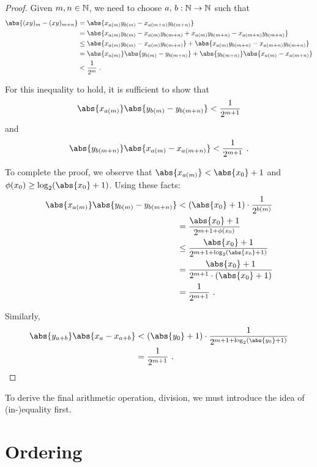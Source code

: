 \documentclass[leqno]{report}
\begin{document}
\begin{proof}
    Given $m, n \in \mathbb{N}$, we need to choose $a,\, b : \mathbb{N} \rightarrow \mathbb{N}$ such that
    \begin{align*}
        \abs{(xy)_m - (xy)_{m+n}}
        &= \abs{x_{a(m)} y_{b(m)} - x_{a(m+n)} y_{b(m+n)}} \\
        &= \abs{x_{a(m)} y_{b(m)} - x_{a(m)} y_{b(m+n)} + x_{a(m)} y_{b(m+n)} - x_{a(m+n)} y_{b(m+n)}} \\
        &\leq \abs{x_{a(m)} y_{b(m)} - x_{a(m)} y_{b(m+n)}} + \abs{x_{a(m)} y_{b(m+n)} - x_{a(m+n)} y_{b(m+n)}} \\
        &= \abs{x_{a(m)}}\abs{y_{b(m)} - y_{b(m+n)}} + \abs{y_{b(m+n)}}\abs{x_{a(m)} - x_{a(m+n)}} \\
        &< \frac{1}{2^m}
        \ .
    \end{align*}

    For this inequality to hold, it is sufficient to show that
    \[ \abs{x_{a(m)}}\abs{y_{b(m)} - y_{b(m+n)}} < \frac{1}{2^{m+1}} \]
    and
    \[ \abs{y_{b(m+n)}}\abs{x_{a(m)} - x_{a(m+n)}} < \frac{1}{2^{m+1}} \ . \]

    To complete the proof, we observe that $\abs{x_{a(m)}} < \abs{x_0} + 1$ and $\phi(x_0) \geq \log_2(\abs{x_0} + 1)$. Using these facts:
    \begin{align*}
        \abs{x_{a(m)}}\abs{y_{b(m)} - y_{b(m+n)}}
        &< (\abs{x_0} + 1) \cdot \frac{1}{2^{b(m)}} \\
        &= \frac{\abs{x_0} + 1}{2^{m + 1 + \phi(x_0)}} \\
        &\leq \frac{\abs{x_0} + 1}{2^{m + 1 + \log_2(\abs{x_0} + 1)}} \\
        &= \frac{\abs{x_0} + 1}{2^{m + 1} \cdot (\abs{x_0} + 1)} \\
        &= \frac{1}{2^{m + 1}}
        \ .
    \end{align*}

    Similarly,
    \begin{align*}
        \abs{y_{a+b}}\abs{x_a - x_{a+b}}
        &< (\abs{y_0} + 1) \cdot \frac{1}{2^{m + 1 + \log_2(\abs{y_0} + 1)}} \\
        &= \frac{1}{2^{m + 1}}
        \ . \qedhere
    \end{align*}
\end{proof}

To derive the final arithmetic operation, division, we must introduce the idea of (in-)equality first.

\section{Ordering}
\end{document}
